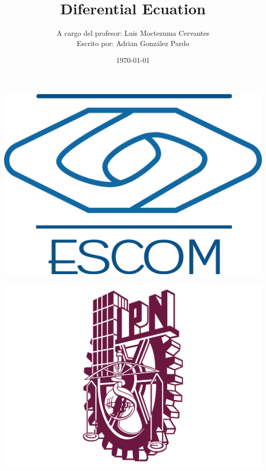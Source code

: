 \documentclass[10pt]{article}
\title{Diferential Ecuation}
\author{A cargo del profesor: Luis Moctezuma Cervantes\\Escrito por: Adrian González Pardo}
\date{\today}
\begin{document}
\begin{minipage}{0.4\textwidth}
	\begin{flushleft}
		\includegraphics[scale = 0.05]{logoescom.png}
	\end{flushleft}
\end{minipage}
\begin{minipage}{0.51\textwidth}
	\begin{flushright}
		\includegraphics[scale = 0.055]{logoipn.png}
	\end{flushright}
\end{minipage}
\end{document}
